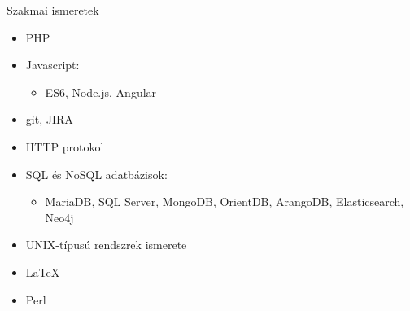 \documentclass{article}
\begin{document}
Szakmai ismeretek

  \begin{itemize}
  
    \item{ PHP }

    \item{ Javascript:

      \begin{itemize}

        \item{ ES6, Node.js, Angular }

      \end{itemize}
    }

    \item{ git, JIRA }

    \item{ HTTP protokol }

    \item{ SQL és NoSQL adatbázisok: 

      \begin{itemize}
    
        \item{ MariaDB, SQL Server, MongoDB, OrientDB, ArangoDB, Elasticsearch, Neo4j }
    
      \end{itemize}
    }

    \item{ UNIX-típusú rendszrek ismerete }

    \item{\LaTeX}

    \item{ Perl }

  \end{itemize}



\end{document}
